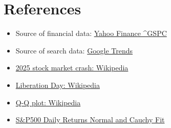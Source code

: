 \documentclass[../main.tex]{subfiles}
\begin{document}
\newpage
\section{References}

\begin{itemize}
  \item Source of financial data: \href{https://finance.yahoo.com/quote/\%5EGSPC/}{Yahoo Finance \^{}GSPC}
  \item Source of search data: \href{https://trends.google.com/trends/}{Google Trends}
  \item \href{https://en.wikipedia.org/wiki/2025_stock_market_crash}{2025 stock market crash: Wikipedia}
  \item \href{https://en.wikipedia.org/wiki/Liberation_Day}{Liberation Day: Wikipedia}
  \item \href{https://en.wikipedia.org/wiki/Q\%E2\%80\%93Q_plot}{Q-Q plot: Wikipedia}
  \item \href{https://www.kaggle.com/code/carlmcbrideellis/s-p-500-daily-returns-normal-and-cauchy-fits}{S\&P500 Daily Returns Normal and Cauchy Fit}
  
\end{itemize}
\end{document}
